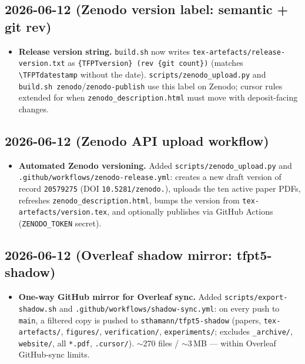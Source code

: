 \documentclass[11pt]{article}
\begin{document}
\subsection*{2026-06-12 (Zenodo version label: semantic + git rev)}
\begin{itemize}
\item \textbf{Release version string.} \texttt{build.sh} now writes
  \texttt{tex-artefacts/release-version.txt} as \texttt{\{TFPTversion\} (rev \{git count\})}
  (matches \texttt{\textbackslash TFPTdatestamp} without the date). \texttt{scripts/zenodo\_upload.py}
  and \texttt{build.sh zenodo}/\texttt{zenodo-publish} use this label on Zenodo; cursor rules extended
  for when \texttt{zenodo\_description.html} must move with deposit-facing changes.
\end{itemize}

\subsection*{2026-06-12 (Zenodo API upload workflow)}
\begin{itemize}
\item \textbf{Automated Zenodo versioning.} Added \texttt{scripts/zenodo\_upload.py} and
  \texttt{.github/workflows/\allowbreak zenodo-release.yml}: creates a new draft version of record
  \texttt{20579275} (DOI \texttt{10.5281/\allowbreak zenodo.}), uploads the ten active paper PDFs,
  refreshes \texttt{zenodo\_description.html}, bumps the version from \texttt{tex-artefacts/version.tex},
  and optionally publishes via GitHub Actions (\texttt{ZENODO\_TOKEN} secret).
\end{itemize}

\subsection*{2026-06-12 (Overleaf shadow mirror: tfpt5-shadow)}
\begin{itemize}
\item \textbf{One-way GitHub mirror for Overleaf sync.} Added \texttt{scripts/export-shadow.sh} and
  \texttt{.github/workflows/shadow-sync.yml}: on every push to \texttt{main}, a filtered copy is pushed to
  \texttt{sthamann/tfpt5-shadow} (papers, \texttt{tex-artefacts/}, \texttt{figures/},
  \texttt{verification/}, \texttt{experiments/}; excludes \texttt{\_archive/}, \texttt{website/}, all
  \texttt{*.pdf}, \texttt{.cursor/}). $\sim$270 files / $\sim$3\,MB --- within Overleaf GitHub-sync limits.
\end{itemize}
\end{document}
